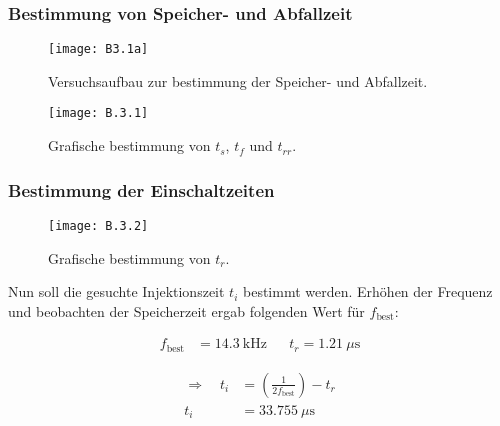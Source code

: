 \documentclass[
	a4paper, %
	12pt, %
]{CSUniSchoolLabReport}
\newcommand{\micro}{\ensuremath{\mu}}
\begin{document}
\subsubsection{Bestimmung von Speicher- und Abfallzeit}

\begin{figure}[H] %
	\centering %
	\texttt{[image: B3.1a]} %
	\caption{Versuchsaufbau zur bestimmung der Speicher- und Abfallzeit.}
	\vspace{1em}
\end{figure}

\begin{figure}[H] %
	\centering %
	\texttt{[image: B.3.1]} %
	\caption{Grafische bestimmung von $t_s$, $t_f$ und $t_{rr}$.}
\end{figure}

\subsubsection{Bestimmung der Einschaltzeiten}
\begin{figure}[H] %
	\centering %
	\texttt{[image: B.3.2]} %
	\caption{Grafische bestimmung von $t_r$.}
	\vspace{1em}
\end{figure}

Nun soll die gesuchte Injektionszeit $t_i$ bestimmt werden. Erhöhen der Frequenz und beobachten der Speicherzeit ergab folgenden Wert für $f_{\text{best}}$: 

\begin{align*}
    f_{\text{best}} &= \SI{14,3}{\kilo\hertz} 
    && t_r = \SI{1,21}{\micro\second}
\end{align*}

\begin{align*}
	\Rightarrow\quad 
    t_i &= \left(\frac{1}{2 f_{\text{best}}}\right) - t_r \\
    t_i &= \SI{33,755}{\micro\second}
\end{align*}
\end{document}

